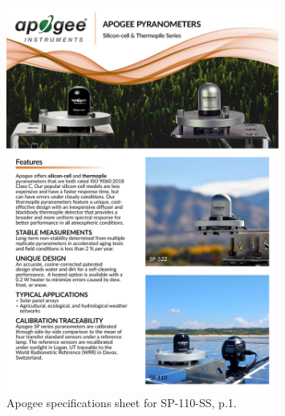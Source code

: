 \begin{appendices}
\begin{figure}[!h]
\centering
\includegraphics[width=0.8\textwidth]{Appendices/Apogee_SP-110-SS_spec-sheet_p1.pdf}
\caption*{Apogee specifications sheet for SP-110-SS, p.1.}
\end{figure}

\newpage


\end{appendices}
